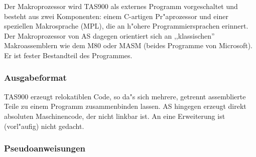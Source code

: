 \documentclass[12pt,a4paper,twoside]{report}
\begin{document}
{Der Makroprozessor wird TAS900 als externes Programm vorgeschaltet und
besteht aus zwei Komponenten: einem C-artigen Pr"aprozessor und einer
speziellen Makrosprache (MPL), die an h"ohere Programmiersprachen
erinnert.  Der Makroprozessor von AS dagegen orientiert sich an
,,klassischen'' Makroassemblern wie dem M80 oder MASM (beides Programme
von Microsoft).  Er ist fester Bestandteil des Programmes.

\subsubsection{Ausgabeformat}

TAS900 erzeugt relokatiblen Code, so da"s sich mehrere, getrennt assemblierte
Teile zu einem Programm zusammenbinden lassen.  AS hingegen erzeugt direkt
absoluten Maschinencode, der nicht linkbar ist.  An eine Erweiterung ist
(vorl"aufig) nicht gedacht.

\subsubsection{Pseudoanweisungen}

}
\end{document}
